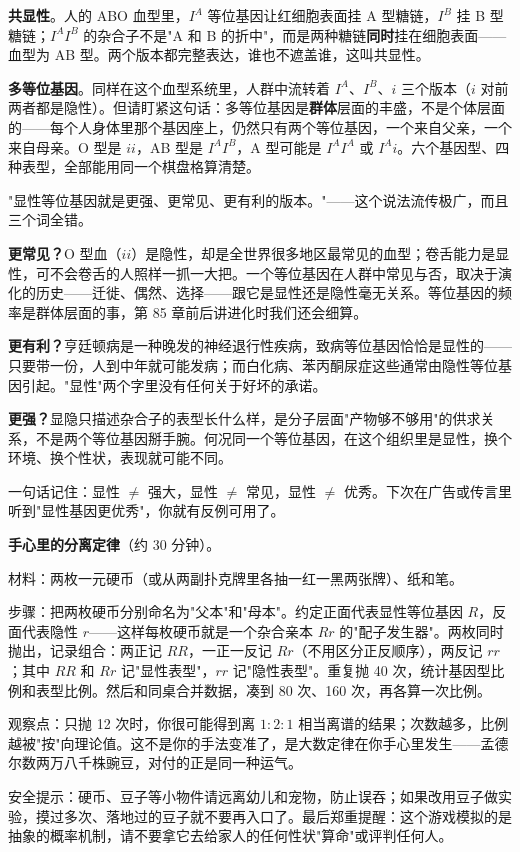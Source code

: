 \textbf{共显性}。人的 ABO 血型里，$I^A$ 等位基因让红细胞表面挂 A 型糖链，$I^B$ 挂 B 型糖链；$I^A I^B$ 的杂合子不是"A 和 B 的折中"，而是两种糖链\textbf{同时}挂在细胞表面——血型为 AB 型。两个版本都完整表达，谁也不遮盖谁，这叫共显性。

\textbf{多等位基因}。同样在这个血型系统里，人群中流转着 $I^A$、$I^B$、$i$ 三个版本（$i$ 对前两者都是隐性）。但请盯紧这句话：多等位基因是\textbf{群体}层面的丰盛，不是个体层面的——每个人身体里那个基因座上，仍然只有两个等位基因，一个来自父亲，一个来自母亲。O 型是 $ii$，AB 型是 $I^A I^B$，A 型可能是 $I^A I^A$ 或 $I^A i$。六个基因型、四种表型，全部能用同一个棋盘格算清楚。

\begin{wuqu}
"显性等位基因就是更强、更常见、更有利的版本。"——这个说法流传极广，而且三个词全错。

\textbf{更常见？}O 型血（$ii$）是隐性，却是全世界很多地区最常见的血型；卷舌能力是显性，可不会卷舌的人照样一抓一大把。一个等位基因在人群中常见与否，取决于演化的历史——迁徙、偶然、选择——跟它是显性还是隐性毫无关系。等位基因的频率是群体层面的事，第 85 章前后讲进化时我们还会细算。

\textbf{更有利？}亨廷顿病是一种晚发的神经退行性疾病，致病等位基因恰恰是显性的——只要带一份，人到中年就可能发病；而白化病、苯丙酮尿症这些通常由隐性等位基因引起。"显性"两个字里没有任何关于好坏的承诺。

\textbf{更强？}显隐只描述杂合子的表型长什么样，是分子层面"产物够不够用"的供求关系，不是两个等位基因掰手腕。何况同一个等位基因，在这个组织里是显性，换个环境、换个性状，表现就可能不同。

一句话记住：显性 $\neq$ 强大，显性 $\neq$ 常见，显性 $\neq$ 优秀。下次在广告或传言里听到"显性基因更优秀"，你就有反例可用了。
\end{wuqu}

\begin{shiyan}
\textbf{手心里的分离定律}（约 30 分钟）。

材料：两枚一元硬币（或从两副扑克牌里各抽一红一黑两张牌）、纸和笔。

步骤：把两枚硬币分别命名为"父本"和"母本"。约定正面代表显性等位基因 $R$，反面代表隐性 $r$——这样每枚硬币就是一个杂合亲本 $Rr$ 的"配子发生器"。两枚同时抛出，记录组合：两正记 $RR$，一正一反记 $Rr$（不用区分正反顺序），两反记 $rr$；其中 $RR$ 和 $Rr$ 记"显性表型"，$rr$ 记"隐性表型"。重复抛 40 次，统计基因型比例和表型比例。然后和同桌合并数据，凑到 80 次、160 次，再各算一次比例。

观察点：只抛 12 次时，你很可能得到离 $1:2:1$ 相当离谱的结果；次数越多，比例越被"按"向理论值。这不是你的手法变准了，是大数定律在你手心里发生——孟德尔数两万八千株豌豆，对付的正是同一种运气。

安全提示：硬币、豆子等小物件请远离幼儿和宠物，防止误吞；如果改用豆子做实验，摸过多次、落地过的豆子就不要再入口了。最后郑重提醒：这个游戏模拟的是抽象的概率机制，请不要拿它去给家人的任何性状"算命"或评判任何人。
\end{shiyan}

